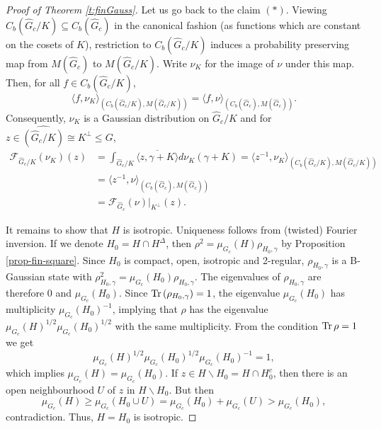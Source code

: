 \documentclass[12pt,reqno]{amsart}
\theoremstyle{definition}
\theoremstyle{definition}
\theoremstyle{definition}
\numberwithin{thm}{section}
\numberwithin{equation}{section}
\newcommand{\la}{\langle}
\newcommand{\ra}{\rangle}
\newcommand{\mc}[1]{\mathcal #1}
\newcommand{\tr}{{\rm Tr}\,}
\newcommand{\wh}[1]{\widehat{#1}}
\begin{document}
\begin{proof}[Proof of Theorem \ref{t:finGauss}]
Let us go back to the claim $(*)$. Viewing $C_b(\wh{G}_c/K)\subseteq C_b(\wh{G}_c)$ in the canonical fashion (as functions which are constant on the cosets of $K$), restriction to $C_b(\wh{G}_c/K)$ induces a probability preserving map from $M(\wh{G}_c)$ to $M(\wh{G}_c/K)$. Write $\nu_K$ for the image of $\nu$ under this map. Then, for all $f\in C_b(\wh{G}_c/K)$,
$$\la f,\nu_K\ra_{(C_b(\wh{G}_c/K),M(\wh{G}_c/K))}=\la f,\nu\ra_{(C_b(\wh{G}_c),M(\wh{G}_c))}.$$ Consequently, $\nu_K$ is a Gaussian distribution on $\wh{G}_c/K$ and for $z\in\widehat{(\wh{G}_c/K)}\cong K^\perp\leq G$,
\begin{align*}\mc{F}_{\wh{G}_c/K}(\nu_K)(z)&=\int_{\wh{G}_c/K}\overline{\la z,\gamma+K\ra}d\nu_K(\gamma+K) =\la z^{-1},\nu_K\ra_{(C_b(\wh{G}_c/K),M(\wh{G}_c/K))}\\
&=\la z^{-1},\nu\ra_{(C_b(\wh{G}_c),M(\wh{G}_c))}\\
&=\mc{F}_{\wh{G}_c}(\nu)|_{K^\perp}(z).
\end{align*}

It remains to show that $H$ is isotropic. Uniqueness follows from (twisted) Fourier inversion.
If we denote $H_0=H\cap H^{\Delta}$, then $\rho^2=\mu_{G_c}(H)\rho_{H_0,\gamma}$ by Proposition \ref{prop-fin-square}. Since $H_0$ is compact, open, isotropic and 2-regular, $\rho_{H_0,\gamma}$ is a B-Gaussian state with $\rho_{H_0,\gamma}^2=\mu_{G_c}(H_0)\rho_{H_0,\gamma}$.
The eigenvalues of $\rho_{H_0,\gamma}$ are therefore 0 and $\mu_{G_c}(H_0)$. Since $\tr(\rho_{H_0,\gamma})=1$, the eigenvalue $\mu_{G_c}(H_0)$ has multiplicity $\mu_{G_c}(H_0)^{-1}$, implying that $\rho$ has the eigenvalue $\mu_{G_c}(H)^{1/2}\mu_{G_c}(H_0)^{1/2}$ with the same multiplicity.
From the condition $\tr\rho=1$ we get 
$$\mu_{G_c}(H)^{1/2}\mu_{G_c}(H_0)^{1/2}\mu_{G_c}(H_0)^{-1}=1,$$
which implies $\mu_{G_c}(H)=\mu_{G_c}(H_0)$. If $z\in H\backslash H_0=H\cap H_0^c$, then there is an open neighbourhood $U$ of $z$ in $H\backslash H_0$. But then 
$$\mu_{G_c}(H)\geq\mu_{G_c}(H_0\cup U)=\mu_{G_c}(H_0)+\mu_{G_c}(U)>\mu_{G_c}(H_0),$$
contradiction. Thus, $H=H_0$ is isotropic. 
\end{proof}
\end{document}
